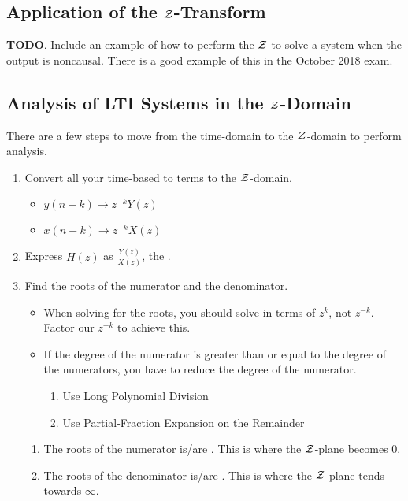 \subsection{Application of the \texorpdfstring{$\operatorname{\mathcal{Z}}$-Transform}{Z-Transform}}\label{subsec:Application_Z-Transform}
\textbf{TODO}.
Include an example of how to perform the $\operatorname{\mathcal{Z}}$ to solve a system when the output is noncausal.
There is a good example of this in the October 2018 exam.

\subsection{Analysis of LTI Systems in the \texorpdfstring{$\operatorname{\mathcal{Z}}$-Domain}{Z-Domain}}\label{subsec:Analysis LTI Systems Z-Domain}
There are a few steps to move from the time-domain to the $\operatorname{\mathcal{Z}}$-domain to perform analysis.
\begin{enumerate}[noitemsep]
\item Convert all your time-based to terms to the $\operatorname{\mathcal{Z}}$-domain.
  \begin{itemize}[noitemsep]
  \item $y(n-k) \rightarrow z^{-k}Y(z)$
  \item $x(n-k) \rightarrow z^{-k}X(z)$
  \end{itemize}
\item Express $H(z)$ as $\frac{Y(z)}{X(z)}$, the .
\item Find the roots of the numerator and the denominator.
  \begin{itemize}[noitemsep]
  \item When solving for the roots, you should solve in terms of $z^{k}$, not $z^{-k}$. Factor our $z^{-k}$ to achieve this.
  \item If the degree of the numerator is greater than or equal to the degree of the numerators, you have to reduce the degree of the numerator.
    \begin{enumerate}[noitemsep]
    \item Use Long Polynomial Division
    \item Use Partial-Fraction Expansion on the Remainder
    \end{enumerate}
  \end{itemize}
  \begin{enumerate}[noitemsep]
  \item The roots of the numerator is/are . This is where the $\operatorname{\mathcal{Z}}$-plane becomes 0.
  \item The roots of the denominator is/are . This is where the $\operatorname{\mathcal{Z}}$-plane tends towards $\infty$.
  \end{enumerate}
\end{enumerate}

